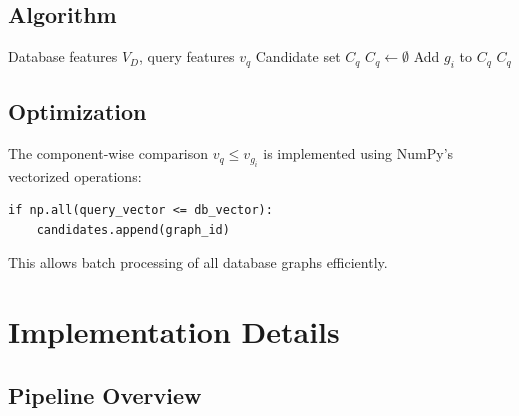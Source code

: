 \documentclass[12pt,a4paper]{article}
\begin{document}
\subsection{Algorithm}

\begin{algorithm}[H]
\caption{Candidate Set Generation}
\begin{algorithmic}[1]
\Require Database features $V_D$, query features $v_q$
\Ensure Candidate set $C_q$
\State $C_q \gets \emptyset$
        \State Add $g_i$ to $C_q$
    \EndIf
\EndFor
\State \Return $C_q$
\end{algorithmic}
\end{algorithm}

\subsection{Optimization}

The component-wise comparison $v_q \leq v_{g_i}$ is implemented using NumPy's vectorized operations:

\begin{verbatim}
if np.all(query_vector <= db_vector):
    candidates.append(graph_id)
\end{verbatim}

This allows batch processing of all database graphs efficiently.

\section{Implementation Details}

\subsection{Pipeline Overview}
\end{document}

